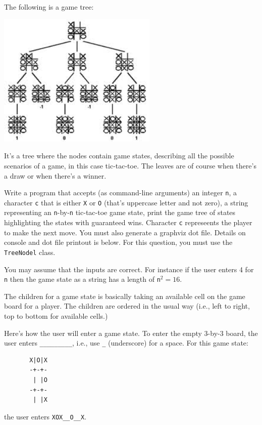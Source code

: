 The following is a game tree:

\begin{center}
\includegraphics[width=3in]{ttt.jpg}
\end{center}

It's a tree where the nodes contain game states, describing
all the possible scenarios of a game, in this case tic-tac-toe.
The leaves are of course when there's a draw or when there's a winner.

Write a program that accepts (as command-line arguments)
an integer \verb!n!, a character \verb!c!
that is either \verb!X! or \verb!O! (that's uppercase letter and not 
zero), a
string representing an \verb!n!-by-\verb!n! tic-tac-toe
game state, print the game tree of states highlighting
the states with guaranteed wins.
Character \verb!c! represeents the player to make the next move.
You must also generate a graphviz dot file.
Details on console and dot file printout is below.
For this question, you must use the \verb!TreeNodel! class.

You may assume that the inputs are correct.
For instance if the user enters 4 for \verb!n! then the 
game state as a string has 
a length of \verb!n!$^2 = 16$.

The children for a game state is basically taking an available cell on the
game board for a player. 
The children are ordered in the usual way 
(i.e., left to right, top to bottom for available cells.)

Here's how the user will enter 
a game state. 
To enter the empty $3$-by-$3$ board,
the user enters \verb!_________!, i.e., use \verb!_! (underscore) for a space.
For this game state:
{\small
\begin{Verbatim}
       X|O|X
       -+-+-
        | |O 
       -+-+-
        | |X
\end{Verbatim}
}
the user enters \verb!XOX__O__X!.


